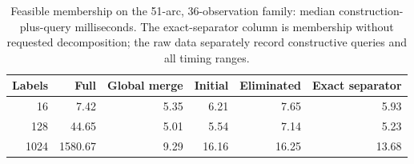 \begin{table}[tb]\centering\small
\caption{Feasible membership on the 51-arc, 36-observation family: median construction-plus-query milliseconds. The exact-separator column is membership without requested decomposition; the raw data separately record constructive queries and all timing ranges.}
\label{tab:computation-member}
\begin{tabular}{rrrrrr}\toprule
Labels & Full & Global merge & Initial & Eliminated & Exact separator\\\midrule
16 & 7.42 & 5.35 & 6.21 & 7.65 & 5.93 \\
128 & 44.65 & 5.01 & 5.54 & 7.14 & 5.23 \\
1024 & 1580.67 & 9.29 & 16.16 & 16.25 & 13.68 \\
\bottomrule\end{tabular}\end{table}
